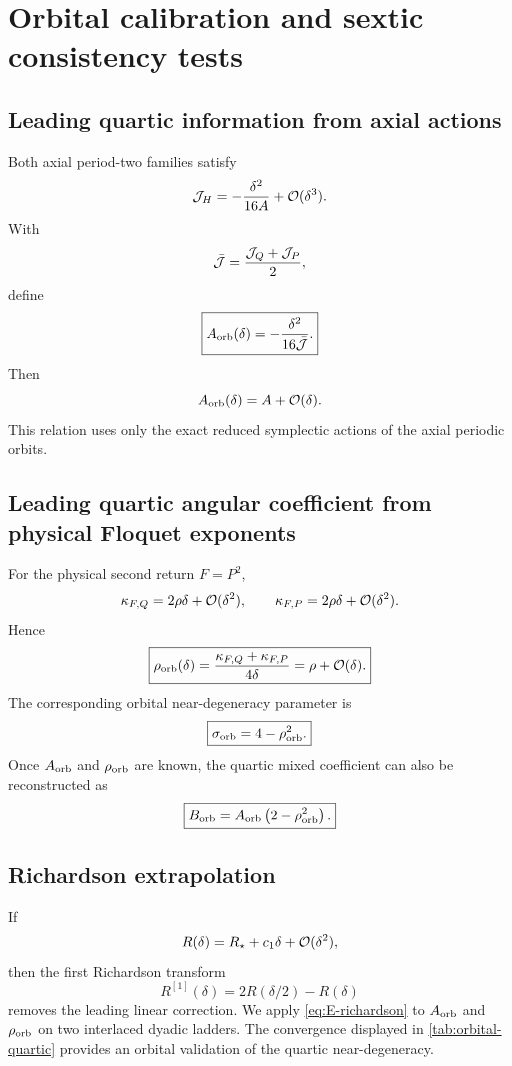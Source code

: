 \section{Orbital calibration and sextic consistency tests}
\label{app:orbital}

\subsection{Leading quartic information from axial actions}

Both axial period-two families satisfy
\[
\mathcal{J}_H
=
-\frac{\delta^2}{16A}
+\mathcal{O}(\delta^3).
\]
With
\[
\bar{\mathcal{J}}
=
\frac{\mathcal{J}_Q+\mathcal{J}_P}{2},
\]
define
\begin{equation}
\boxed{
A_{\rm orb}(\delta)
=
-\frac{\delta^2}{16\bar{\mathcal{J}}}.
}
\label{eq:E-Aorb}
\end{equation}
Then
\[
A_{\rm orb}(\delta)=A+\mathcal{O}(\delta).
\]
This relation uses only the exact reduced symplectic actions of the axial periodic orbits.

\subsection{Leading quartic angular coefficient from physical Floquet exponents}

For the physical second return $F=P^2$,
\[
\kappa_{F,Q}=2\rho\delta+\mathcal{O}(\delta^2),
\qquad
\kappa_{F,P}=2\rho\delta+\mathcal{O}(\delta^2).
\]
Hence
\begin{equation}
\boxed{
\rho_{\rm orb}(\delta)
=
\frac{\kappa_{F,Q}+\kappa_{F,P}}{4\delta}
=
\rho+\mathcal{O}(\delta).
}
\label{eq:E-rhoorb}
\end{equation}
The corresponding orbital near-degeneracy parameter is
\[
\boxed{
\sigma_{\rm orb}=4-\rho_{\rm orb}^2.
}
\]
Once $A_{\rm orb}$ and $\rho_{\rm orb}$ are known, the quartic mixed coefficient can also be reconstructed as
\[
\boxed{
B_{\rm orb}
=A_{\rm orb}\left(2-\rho_{\rm orb}^2\right).
}
\]

\subsection{Richardson extrapolation}

If
\[
R(\delta)=R_\star+c_1\delta+\mathcal{O}(\delta^2),
\]
then the first Richardson transform
\begin{equation}
\boxed{
R^{[1]}(\delta)
=2R(\delta/2)-R(\delta)
}
\label{eq:E-richardson}
\end{equation}
removes the leading linear correction.  We apply \eqref{eq:E-richardson} to $A_{\rm orb}$ and $\rho_{\rm orb}$ on two interlaced dyadic ladders.  The convergence displayed in \cref{tab:orbital-quartic} provides an orbital validation of the quartic near-degeneracy.


